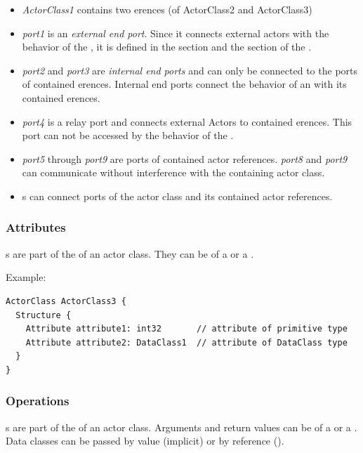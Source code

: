 \begin{itemize}
\item \textit{ActorClass1} contains two erences (of ActorClass2 and ActorClass3)
\item \textit{port1} is an \textit{external end port}. Since it connects external actors with the behavior 
of the , it is defined in the  section and the  section of 
the .
\item \textit{port2} and \textit{port3} are \textit{internal end ports} and can only be connected to the 
ports of contained erences. Internal end ports connect the behavior of an  with its 
contained erences.
\item \textit{port4} is a relay port and connects external Actors to contained erences. This port 
can not be accessed by the behavior of the .
\item \textit{port5} through \textit{port9} are ports of contained actor references. \textit{port8} and 
\textit{port9} can communicate without interference with the containing actor class.
\item {}s can connect ports of the actor class and its contained actor references. 
\end{itemize}

\subsubsection{Attributes}

s are part of the  of an actor class.
They can be of a  or a .

Example:

\begin{lstlisting}
ActorClass ActorClass3 {
  Structure {
    Attribute attribute1: int32       // attribute of primitive type
    Attribute attribute2: DataClass1  // attribute of DataClass type
  }
}
\end{lstlisting}

\subsubsection{Operations}

s are part of the  of an actor class.  Arguments and return values can be of a 
 or a . Data classes can be passed by value (implicit) or by reference ().


